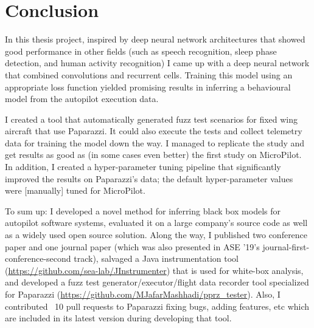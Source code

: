 \chapter{Conclusion} \label{sec:summary} %

In this thesis project, inspired by deep neural network architectures that showed good performance in other fields (such as speech recognition, sleep phase detection, and human activity recognition) I came up with a deep neural network that combined convolutions and recurrent cells. Training this model using an appropriate loss function yielded promising results in inferring a behavioural model from the autopilot execution data.

I created a tool that automatically generated fuzz test scenarios for fixed wing aircraft that use Paparazzi. It could also execute the tests and collect telemetry data for training the model down the way. 
I managed to replicate the study and get results as good as (in some cases even better) the first study on MicroPilot. In addition, I created a hyper-parameter tuning pipeline that significantly improved the results on Paparazzi's data; the default hyper-parameter values were [manually] tuned for MicroPilot.

To sum up: I developed a novel method for inferring black box models for autopilot software systems, evaluated it on a large company's source code as well as a widely used open source solution. Along the way, I published two conference paper and one journal paper (which was also presented in ASE '19's journal-first-conference-second track), salvaged a Java instrumentation tool (\url{https://github.com/sea-lab/JInstrumenter}) that is used for white-box analysis, and developed a fuzz test generator/executor/flight data recorder tool specialized for Paparazzi (\url{https://github.com/MJafarMashhadi/pprz_tester}). Also, I contributed ~10 pull requests to Paparazzi fixing bugs, adding features, etc which are included in its latest version during developing that tool.



